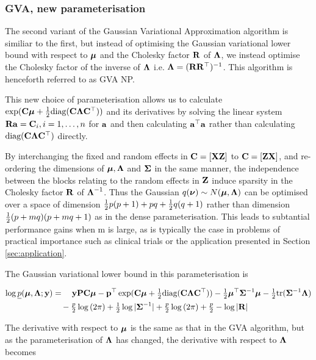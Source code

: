 \documentclass{article}[12pt]
\begin{document}
\subsubsection{GVA, new parameterisation}

The second variant of the Gaussian Variational Approximation algorithm is similiar to the first, but instead
of optimising the Gaussian variational lower bound with respect to ${\boldsymbol \mu}$ and the Cholesky factor ${\bf R}$ of
${\boldsymbol \Lambda}$, we instead optimise the Cholesky factor of the inverse of ${\boldsymbol \Lambda}$ i.e. ${\boldsymbol \Lambda} = ({\bf R}
{\bf R}^\top)^{-1}$. This algorithm is henceforth referred to as GVA NP.

This new choice of parameterisation allows us to calculate $\exp({\bf C} {\boldsymbol \mu} + {\tfrac{1}{2}} \text{diag}({\bf C} {\boldsymbol \Lambda}
{\bf C}^\top))$ and its derivatives by solving the linear system ${\bf R} {\bf a} = {\bf C}_{i}, i=1, \ldots, n$ for ${\bf a}$ and
then calculating ${\bf a}^\top{\bf a}$ rather than calculating $\text{diag}({\bf C} {\boldsymbol \Lambda} {\bf C}^\top)$ directly.

By interchanging the fixed and random effects in ${\bf C} = [{\bf X} {\bf Z}]$ to ${\bf C} = [{\bf Z} {\bf X}]$, and re- ordering the
dimensions of ${\boldsymbol \mu}, {\boldsymbol \Lambda}$ and ${\boldsymbol \Sigma}$ in the same manner, the independence between the blocks relating
to the random effects in ${\bf Z}$ induce sparsity in the Cholesky factor ${\bf R}$ of ${\boldsymbol \Lambda}^{-1}$. Thus the
Gaussian $q({\boldsymbol \nu}) \sim N({\boldsymbol \mu}, {\boldsymbol \Lambda})$ can be optimised over a space of dimension ${\tfrac{1}{2}} p (p + 1) + pq +
{\tfrac{1}{2}} q (q + 1)$ rather than dimension ${\tfrac{1}{2}} (p + mq) (p + mq + 1)$ as in the dense parameterisation. This
leads to subtantial performance gains when m is large, as is typically the case in problems of practical
importance such as clinical trials or the application presented in Section \ref{sec:application}.

The Gaussian variational lower bound in this parameterisation is

\begin{align*}
\log \underline{p}({\boldsymbol \mu}, {\boldsymbol \Lambda}; {\bf y}) &= \quad {\bf y}{\bf P}{\bf C} {\boldsymbol\mu} - {\bf p}^\top \exp({\bf C} {\boldsymbol \mu} + {\tfrac{1}{2}} \text{diag}({\bf C} {\boldsymbol \Lambda} {\bf C}^\top)) - {\tfrac{1}{2}} {\boldsymbol \mu}^\top {\boldsymbol\Sigma}^{-1} {\boldsymbol \mu} - {\tfrac{1}{2}} \text{tr}{({\boldsymbol\Sigma}^{-1} {\boldsymbol\Lambda})} \\
&\quad- \tfrac{p}{2} \log{(2 \pi)} + {\tfrac{1}{2}} \log{|{\boldsymbol\Sigma}^{-1}|} + \tfrac{p}{2} \log{(2 \pi)} + \tfrac{p}{2} - \log{|{\bf R}|}
\end{align*}

The derivative with respect to ${\boldsymbol \mu}$ is the same as that in the GVA algorithm, but as the parameterisation of
${\boldsymbol \Lambda}$ has changed, the  derivative with respect to ${\boldsymbol \Lambda}$ becomes
\end{document}
